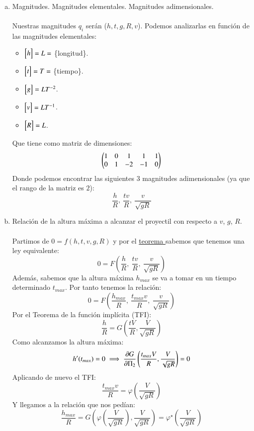 \begin{eg}[H1.4]$ $
    \begin{enumerate}[a)]
        \item Magnitudes. Magnitudes elementales. Magnitudes adimensionales.\\\\
        Nuestras magnitudes $q_i$ serán ($h, t, g, R, v$). Podemos analizarlas en función de las magnitudes elementales:
        \begin{itemize}
            \item $\mx{h} = L = $ \{longitud\}.
            \item $\mx{t} = T = $ \{tiempo\}.
            \item $\mx{g} = L T^{-2}$.
            \item $\mx{v} = L T^{-1}$.
            \item $\mx{R} = L$.
        \end{itemize}
        Que tiene como matriz de dimensiones:
        $$
            \dmx{
                1 & 0 &  1 &  1 & 1\\
                0 & 1 & -2 & -1 & 0
            }
        $$
        Donde podemos encontrar las siguientes $3$ magnitudes adimensionales (ya que el rango de la matriz es $2$):
        $$
            \frac{h}{R},\ \frac{tv}{R},\ \frac{v}{\sqrt{gR}}
        $$
        \item Relación de la altura máxima a alcanzar el proyectil con respecto a $v$, $g$, $R$.\\\\
        Partimos de $0 = f(h, t, v, g, R)$ y por el \hyperref[thm:pi]{teorema \Pi} sabemos que tenemos una ley equivalente:
        $$
            0 = F\left(\frac{h}{R},\ \frac{tv}{R},\ \frac{v}{\sqrt{gR}}\right)
        $$
        Además, sabemos que la altura máxima $h_{max}$ se va a tomar en un tiempo determinado $t_{max}$. Por tanto tenemos la relación:
        $$
            0 = F\left(\frac{h_{max}}{R},\ \frac{t_{max}v}{R},\ \frac{v}{\sqrt{gR}}\right)
        $$
        Por el Teorema de la función implícita (TFI):
        $$
            \frac{h}{R} = G\left( \frac{tV}{R}, \frac{V}{\sqrt{gR}} \right)
        $$
        Como alcanzamos la altura máxima:
        $$
            h'(t_{max}) = 0 \implies \frac{\partial G}{\partial \Pi_2}\left( \frac{t_{max}V}{R}, \frac{V}{\sqrt{gR}} \right) = 0
        $$
        Aplicando de nuevo el TFI:
        $$
            \frac{t_{max} v}{R} = \varphi\left( \frac{V}{\sqrt{gR}} \right)
        $$
        Y llegamos a la relación que nos pedían:
        $$
            \frac{h_{max}}{R} = G\left( \varphi\left( \frac{V}{\sqrt{gR}} \right), \frac{V}{\sqrt{gR}} \right) = \varphi^{\star}\left( \frac{V}{\sqrt{gR}} \right)
        $$
    \end{enumerate}
\end{eg}
